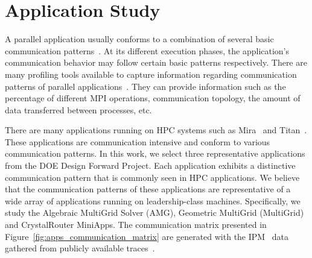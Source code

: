 
\section{Application Study}
\label{sec:application study}


A parallel application usually conforms to a combination of several basic communication patterns~\cite{roth}. 
At its different execution phases, 
the application's communication behavior may follow certain basic patterns respectively. 
There are many profiling tools available to capture 
information regarding communication patterns of parallel applications~\cite{tau,mpip,sst,oxbow}. 
They can provide information such as the percentage of different MPI operations, 
communication topology, the amount of data transferred between processes, etc.

There are many applications running on HPC systems such as Mira~\cite{bgq} and Titan~\cite{titan}. 
These applications are communication intensive and conform to various communication patterns. 
In this work, we select three representative applications from the DOE Design Forward Project. 
Each application exhibits a distinctive communication pattern that is commonly seen in HPC applications. 
We believe that the communication patterns of these applications 
are representative of a wide array of applications running on leadership-class machines. 
Specifically, we study the Algebraic MultiGrid Solver (AMG), 
Geometric MultiGrid (MultiGrid) and CrystalRouter MiniApps. 
The communication matrix presented in Figure~\ref{fig:apps_communication_matrix}
are generated with the IPM~\cite{ipm} data gathered from publicly available traces~\cite{designforwardwebpage}.


